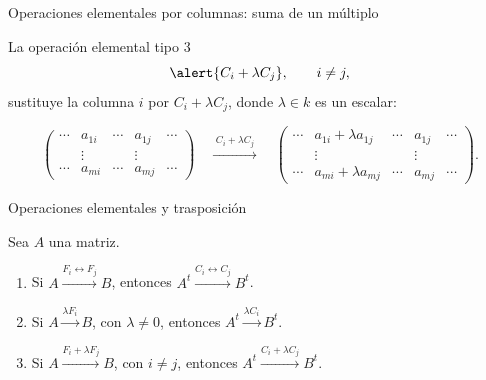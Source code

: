 \begin{frame}{Operaciones elementales por columnas: suma de un múltiplo}

La \alert{operación elemental tipo 3}
\[
\alert{C_i+\lambda C_j},
\qquad i\neq j,
\]
sustituye la columna \(i\) por \(C_i+\lambda C_j\), donde
\(\lambda\in k\) es un escalar:

\medskip

\[
\begin{pmatrix}
\cdots & a_{1i} & \cdots & a_{1j} & \cdots\\
       & \vdots &        & \vdots &       \\
\cdots & a_{mi} & \cdots & a_{mj} & \cdots
\end{pmatrix}
\quad
\xrightarrow{\;C_i+\lambda C_j\;}
\quad
\begin{pmatrix}
\cdots & a_{1i}+\lambda a_{1j} & \cdots & a_{1j} & \cdots\\
       & \vdots                  &        & \vdots &       \\
\cdots & a_{mi}+\lambda a_{mj} & \cdots & a_{mj} & \cdots
\end{pmatrix}.
\]

\end{frame}

\begin{frame}{Operaciones elementales y trasposición}

\begin{theorem}
Sea \(A\) una matriz.

\begin{enumerate}
\item Si \(A\xrightarrow{F_i\leftrightarrow F_j}B\), entonces
\(A^t\xrightarrow{C_i\leftrightarrow C_j}B^t\).

\item Si \(A\xrightarrow{\lambda F_i}B\), con \(\lambda\neq0\), entonces
\(A^t\xrightarrow{\lambda C_i}B^t\).

\item Si \(A\xrightarrow{F_i+\lambda F_j}B\), con \(i\neq j\), entonces
\(A^t\xrightarrow{C_i+\lambda C_j}B^t\).
\end{enumerate}
\end{theorem}

\end{frame}

